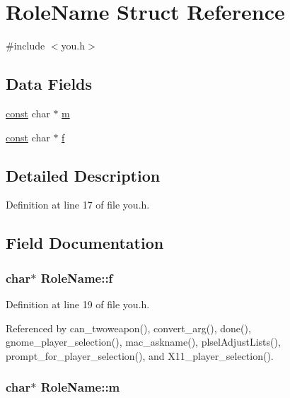 \hypertarget{structRoleName}{\section{Role\+Name Struct Reference}
\label{structRoleName}
}


{\ttfamily \#include $<$you.\+h$>$}

\subsection*{Data Fields}
\begin{DoxyCompactItemize}
\item 
\hyperlink{tradstdc_8h_a2c212835823e3c54a8ab6d95c652660e}{const} char $\ast$ \hyperlink{structRoleName_a264d1ed0d4715edaaad295e8ab4c1002}{m}
\item 
\hyperlink{tradstdc_8h_a2c212835823e3c54a8ab6d95c652660e}{const} char $\ast$ \hyperlink{structRoleName_a9d8f4b8c99abfbf5ca40901e5dcc581a}{f}
\end{DoxyCompactItemize}


\subsection{Detailed Description}


Definition at line 17 of file you.\+h.



\subsection{Field Documentation}
\hypertarget{structRoleName_a9d8f4b8c99abfbf5ca40901e5dcc581a}{
\subsubsection[{f}]{ char$\ast$ Role\+Name\+::f}}\label{structRoleName_a9d8f4b8c99abfbf5ca40901e5dcc581a}


Definition at line 19 of file you.\+h.



Referenced by can\+\_\+twoweapon(), convert\+\_\+arg(), done(), gnome\+\_\+player\+\_\+selection(), mac\+\_\+askname(), plsel\+Adjust\+Lists(), prompt\+\_\+for\+\_\+player\+\_\+selection(), and X11\+\_\+player\+\_\+selection().

\hypertarget{structRoleName_a264d1ed0d4715edaaad295e8ab4c1002}{
\subsubsection[{m}]{ char$\ast$ Role\+Name\+::m}}\label{structRoleName_a264d1ed0d4715edaaad295e8ab4c1002}


